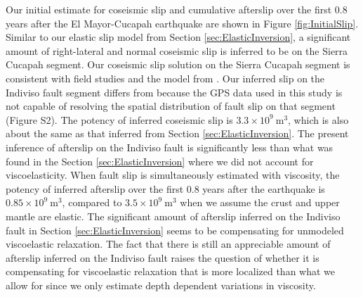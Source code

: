 \documentclass[draft,linenumbers]{AGUJournal}
\begin{document}
Our initial estimate for coseismic slip and cumulative afterslip over the first 0.8 years after the El Mayor-Cucapah earthquake are shown in Figure \ref{fig:InitialSlip}.  Similar to our elastic slip model from Section \ref{sec:ElasticInversion}, a significant amount of right-lateral and normal coseismic slip is inferred to be on the Sierra Cucapah segment. Our coseismic slip solution on the Sierra Cucapah segment is consistent with field studies \citep{Fletcher2014} and the model from \citet{Wei2011}.  Our inferred slip on the Indiviso fault segment differs from \citet{Wei2011} because the GPS data used in this study is not capable of resolving the spatial distribution of fault slip on that segment (Figure S2).  The potency of inferred coseismic slip is $3.3\times 10^{9}\ \mathrm{m}^3$, which is also about the same as that inferred from Section \ref{sec:ElasticInversion}. The present inference of afterslip on the Indiviso fault is significantly less than what was found in the Section \ref{sec:ElasticInversion} where we did not account for viscoelasticity. When fault slip is simultaneously estimated with viscosity, the potency of inferred afterslip over the first 0.8 years after the earthquake is $0.85\times 10^9\ \mathrm{m}^3$, compared to $3.5\times10^{9}\ \mathrm{m}^3$ when we assume the crust and upper mantle are elastic.  The significant amount of afterslip inferred on the Indiviso fault in Section \ref{sec:ElasticInversion} seems to be compensating for unmodeled viscoelastic relaxation.  The fact that there is still an appreciable amount of afterslip inferred on the Indiviso fault raises the question of whether it is compensating for viscoelastic relaxation that is more localized than what we allow for since we only estimate depth dependent variations in viscosity.
\end{document}
